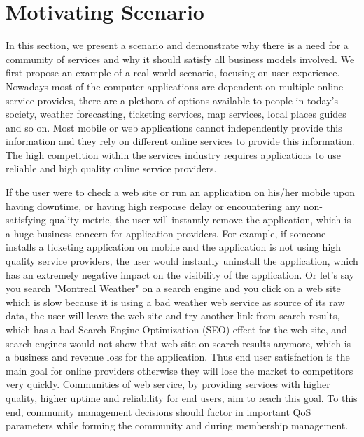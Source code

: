 \section{Motivating Scenario}\label{sec:motexample}

In this section, we present a scenario and demonstrate why there is a need for a community of services and why it should satisfy all business models involved.
We first propose an example of a real world scenario, focusing on user experience. Nowadays most of the computer applications are dependent on multiple online service provides, there are a plethora of options available to people in today's society, weather forecasting, ticketing services, map services, local places guides and so on. Most mobile or web applications cannot independently provide this information and they rely on different online services to provide this information.
The high competition within the services industry requires applications to use reliable and high quality online service providers.


If the user were to check a web site or run an application on his/her mobile upon having downtime, or having high response delay or encountering any non-satisfying quality metric, the user will instantly remove the application, which is a huge business concern for application providers. For example, if someone installs a ticketing application on mobile and the application is not using high quality service providers, the user would instantly uninstall the application, which has an extremely negative impact on the visibility of the application. Or let's say you search "Montreal Weather" on a search engine and you click on a web site which is slow because it is using a bad weather web service as source of its raw data, the user will leave the web site and try another link from search results, which has a bad Search Engine Optimization (SEO) effect for the web site, and search engines would not show that web site on search results anymore, which is a business and revenue loss for the application. Thus end user satisfaction is the main goal for online providers otherwise they will lose the market to competitors very quickly. Communities of web service, by providing services with higher quality, higher uptime and reliability for end users, aim to reach this goal. To this end, community management decisions should factor in important QoS parameters while forming the community and during membership management.
 
